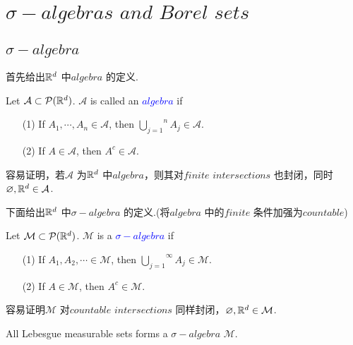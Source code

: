 \newpage
\section{$\sigma-algebras \,\, and \,\, Borel \,\, sets$}
\subsection{$\sigma-algebra$}
	首先给出$\mathbb{R}^d$ 中\textbf{$algebra$} 的定义.
	\begin{defn}
		Let $\mathcal{A} \subset \mathcal{P}(\mathbb{R}^d)$. $\mathcal{A}$ is called an \underline{\textcolor{blue}{\textbf{$algebra$}}} if
		\begin{enumerate}
			\item[(1)]If $A_1 , \cdots , A_n \in \mathcal{A}$, then $\overset{n}{\underset{j = 1}{\bigcup}}{A_j} \in \mathcal{A}$.
			
			\item[(2)]If $A \in \mathcal{A}$, then $A^c \in \mathcal{A}$.
		\end{enumerate}
		
		\begin{rmk}
			容易证明，若$\mathcal{A}$ 为$\mathbb{R}^d$ 中$algebra$，则其对$finite \,\, intersections$ 也封闭，同时$\varnothing , \mathbb{R}^d \in \mathcal{A}$.
		\end{rmk}
	\end{defn}

	\vspace{2em}
	下面给出$\mathbb{R}^d$ 中$\sigma-algebra$ 的定义.(将$algebra$ 中的$finite$ 条件加强为$countable$)
	\begin{defn}
		Let $\mathcal{M} \subset \mathcal{P}(\mathbb{R}^d)$. $\mathcal{M}$ is a \underline{\textcolor{blue}{$\sigma-algebra$}} if
		\begin{enumerate}
			\item[(1)]If $A_1 , A_2 , \cdots \in \mathcal{M}$, then $\overset{\infty}{\underset{j = 1}{\bigcup}}{A_j} \in \mathcal{M}$.
			
			\item[(2)]If $A \in \mathcal{M}$, then $A^c \in \mathcal{M}$.
		\end{enumerate}
		
		\begin{rmk}
			容易证明$\mathcal{M}$ 对$countable \,\, intersections$ 同样封闭，$\varnothing , \mathbb{R}^d \in \mathcal{M}$.
		\end{rmk}
		
		\begin{example}
			All Lebesgue measurable sets forms a $\sigma-algebra$ $\mathcal{M}$.
		\end{example}
	\end{defn}

